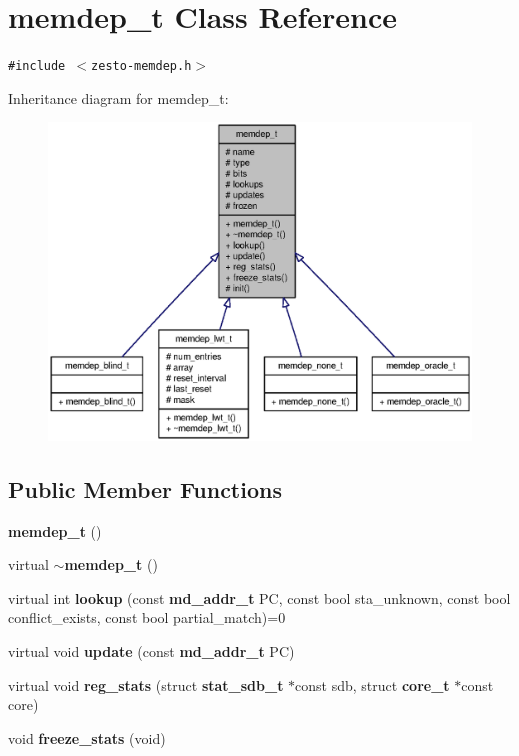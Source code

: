 \section{memdep\_\-t Class Reference}
\label{classmemdep__t}
{\tt \#include $<$zesto-memdep.h$>$}

Inheritance diagram for memdep\_\-t:\nopagebreak
\begin{figure}[H]
\begin{center}
\leavevmode
\includegraphics[width=400pt]{classmemdep__t__inherit__graph}
\end{center}
\end{figure}
\subsection*{Public Member Functions}
\begin{CompactItemize}
\item 
{\bf memdep\_\-t} ()
\item 
virtual {\bf $\sim$memdep\_\-t} ()
\item 
virtual int {\bf lookup} (const {\bf md\_\-addr\_\-t} PC, const bool sta\_\-unknown, const bool conflict\_\-exists, const bool partial\_\-match)=0
\item 
virtual void {\bf update} (const {\bf md\_\-addr\_\-t} PC)
\item 
virtual void {\bf reg\_\-stats} (struct {\bf stat\_\-sdb\_\-t} $\ast$const sdb, struct {\bf core\_\-t} $\ast$const core)
\item 
void {\bf freeze\_\-stats} (void)
\end{CompactItemize}
